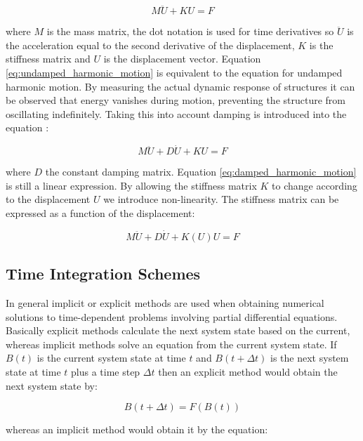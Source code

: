 \begin{equation}
\label{eq:undamped_harmonic_motion}
M \ddot{U} + K U = F
\end{equation}
  
where $M$ is the mass matrix, the dot notation is used for
time derivatives so $\ddot{U}$ is the acceleration equal
to the second derivative of the displacement, $K$ is the stiffness
matrix and $U$ is the displacement vector. Equation
\eqref{eq:undamped_harmonic_motion} is equivalent to the equation for
undamped harmonic motion. By measuring the actual dynamic response of
structures it can be observed that energy vanishes during motion,
preventing the structure from oscillating indefinitely. Taking this into
account damping is introduced into the equation : 

\begin{equation}
\label{eq:damped_harmonic_motion}
M \ddot{U} + D\dot{U} + K U = F
\end{equation}

where $D$ the constant damping matrix. Equation 
\eqref{eq:damped_harmonic_motion} is still a linear expression. 
By allowing the stiffness matrix $K$ to change according to the
displacement $U$ we introduce non-linearity. The stiffness matrix
can be expressed as a function of the displacement:

\begin{equation}
\label{eq:damped_harmonic_motion_nonlinear}
M\ddot{U} + D\dot{U} + K(U)U = F
\end{equation}

\subsection{Time Integration Schemes}
In general implicit or explicit methods are used when obtaining
numerical solutions to time-dependent problems involving partial
differential equations. Basically explicit methods calculate the next
system state based on the current, whereas implicit
methods solve an equation from the current system state. If $B(t)$
is the current system state at time $t$ and 
$B(t + \Delta t)$ is the next system state at time $t$ plus a time
step $\Delta t$ then an explicit method would obtain the next 
system state by:

\begin{equation}
B(t + \Delta t) = F( B(t) )
\end{equation}

whereas an implicit method would obtain it by the equation:

